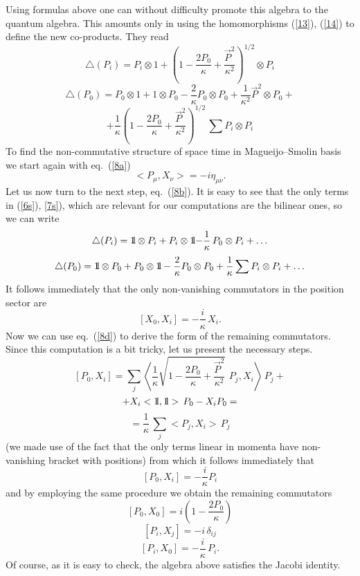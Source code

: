 \documentclass [prd,twocolumn,nofootinbib,showpacs]  {revtex4}
\def\bbbone{{\mathchoice {\rm 1\mskip-4mu l} {\rm 1\mskip-4mu l}
{\rm 1\mskip-4.5mu l} {\rm 1\mskip-5mu l}}}
\begin{document}
 Using  formulas above one can without difficulty promote this algebra to the quantum algebra. This
 amounts only in using the homomorphisms (\ref{13}), (\ref{14}) to define the new co-products. They read
\begin{equation}\label{6s}
  \triangle(P_{i})=P_{i} \otimes 1 + \left(1 - \frac{2P_{0}}{\kappa} +
   \frac{\vec{P}^{2}}{\kappa^{2}}\right)^{{1}/{2}} \otimes P_{i}
\end{equation}
$$
  \triangle(P_{0})=P_{0} \otimes 1 + 1 \otimes P_{0} -
  \frac{2}{\kappa}P_{0} \otimes P_{0} + \frac{1}{\kappa^{2}}
   \vec{P}^{2}\otimes P_{0} +
$$
\begin{equation}\label{7s}
   + \frac{1}{\kappa} \left(1 - \frac{2P_{0}}{\kappa} +
   \frac{\vec{P}^{2}}{\kappa^{2}}\right)^{{1}/{2}} \, \sum P_{i}\otimes P_{i}
\end{equation}
To find the non-commutative structure of space time in Magueijo--Smolin basis we start again with eq.~(\ref{8a})
$$
 <P_\mu, X_\nu> =  -i \eta_{\mu\nu}.
$$
Let us now turn to the next step, eq.~(\ref{8b}). It is easy to
see that the only terms in (\ref{6s}), \ref{7s}),  which are
relevant for our computations are the bilinear ones, so we can
write
$$
  \triangle(P_{i})=\bbbone \otimes P_{i} + P_{i} \otimes \bbbone {-\frac{1}{\kappa}}\, P_{0} \otimes P_{i} + \ldots
$$
$$
  \triangle(P_{0})= \bbbone \otimes P_{0} + P_{0} \otimes \bbbone -
  \frac{2}{\kappa}P_{0} \otimes P_{0} +  \frac{1}{\kappa}\sum P_{i}\otimes P_{i}+ \ldots
$$
It follows immediately that the only non-vanishing commutators in the position sector are
\begin{equation}\label{15}
  [X_0, X_i] = -\frac{i}\kappa\, X_i.
\end{equation}
Now we can use eq.~(\ref{8d}) to derive the form of the remaining
commutators. Since this computation is a bit tricky, let us
present the necessary steps.
$$
[P_0, X_i] = \sum_j \left<\frac{1}{\kappa} \sqrt{1 -
\frac{2P_{0}}{\kappa} +
   \frac{\vec{P}^{2}}{\kappa^{2}}} \,\,  P_{j}, X_i\right>\, P_j  + $$ $$ +
X_i <\bbbone, \bbbone>\, P_0 - X_i P_0 =
$$
$$
=\frac{1}{\kappa}\,\sum_j <P_{j}, X_i>\, P_j
$$
(we made use of the fact that the only terms linear in momenta
have non-vanishing bracket with positions) from which it follows
immediately that
\begin{equation}\label{16b}
 [P_0, X_i] =  -\frac{i}\kappa P_i
\end{equation}
and by employing the same procedure we obtain the remaining
commutators
\begin{equation}\label{16a}
 [P_0, X_0] = i\left(1 - \frac{2P_0}\kappa \right)
\end{equation}
\begin{equation}\label{16c}
  [P_i, X_j] = -i \, \delta_{ij}
\end{equation}
\begin{equation}\label{16d}
 [P_i, X_0] = -\frac{i}\kappa\, P_i.
\end{equation}
Of course, as it is easy to check, the algebra above satisfies the
Jacobi identity.
\end{document}
